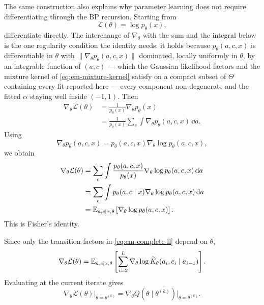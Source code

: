 The same construction also explains why parameter learning does not require
differentiating through the BP recursion. Starting from
\begin{equation}
  \mathcal L(\theta)
  =
  \log p_\theta(x),
\end{equation}
differentiate directly. The interchange of $\nabla_\theta$ with the sum and
the integral below is the one regularity condition the identity needs: it holds
because $p_\theta(a,c,x)$ is differentiable in $\theta$ with
$\|\nabla_\theta p_\theta(a,c,x)\|$ dominated, locally uniformly in
$\theta$, by an integrable function of $(a,c)$ --- which the Gaussian
likelihood factors and the mixture kernel of \eqref{eq:em-mixture-kernel}
satisfy on a compact subset of $\Theta$ containing every fit reported here ---
every component non-degenerate and the fitted $\alpha$ staying well inside
$(-1,1)$. Then
\begin{align}
  \nabla_\theta\mathcal L(\theta)
  &=
  \frac{1}{p_\theta(x)}
  \nabla_\theta p_\theta(x)
  \nonumber\\
  &=
  \frac{1}{p_\theta(x)}
  \sum_c
  \int
  \nabla_\theta p_\theta(a,c,x)\,\dd a.
  \label{eq:em-fisher-step1}
\end{align}
Using
\begin{equation}
  \nabla_\theta p_\theta(a,c,x)
  =
  p_\theta(a,c,x)
  \nabla_\theta\log p_\theta(a,c,x),
\end{equation}
we obtain
\begin{align}
  \nabla_\theta\mathcal L(\theta)
  &=
  \sum_c
  \int
  \frac{p_\theta(a,c,x)}{p_\theta(x)}
  \nabla_\theta
  \log p_\theta(a,c,x)\,\mathrm{d} a
  \nonumber\\
  &=
  \sum_c
  \int
  p_\theta(a,c\mid x)
  \nabla_\theta
  \log p_\theta(a,c,x)\,\mathrm{d} a
  \nonumber\\
  &=
  \mathbb{E}_{a,c\mid x,\theta}
  \left[
    \nabla_\theta
    \log p_\theta(a,c,x)
  \right].
  \label{eq:em-fisher-general}
\end{align}
This is Fisher's identity.

Since only the transition factors in
\eqref{eq:em-complete-ll} depend on $\theta$,
\begin{equation}
  \nabla_\theta\mathcal L(\theta)
  =
  \mathbb{E}_{a,c\mid x,\theta}
  \left[
    \sum_{i=2}^{L}
    \nabla_\theta
    \log
    \widetilde{K}_\theta
    (a_i,c_i\mid a_{i-1})
  \right].
  \label{eq:em-fisher}
\end{equation}
Evaluating at the current iterate gives
\begin{equation}
  \nabla_\theta\mathcal L(\theta)
  \Big|_{\theta=\theta^{(k)}}
  =
  \nabla_\theta
  Q(\theta\mid\theta^{(k)})
  \Big|_{\theta=\theta^{(k)}}.
  \label{eq:em-fisher-Q}
\end{equation}


